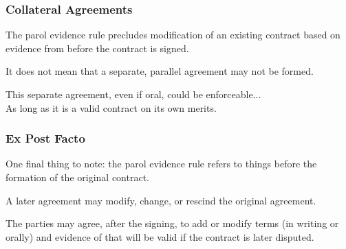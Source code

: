 \begin{frame}
\frametitle{Collateral Agreements}

The parol evidence rule precludes modification of an existing contract based on evidence from before the contract is signed.

It does not mean that a separate, parallel agreement may not be formed. 

This separate agreement, even if oral, could be enforceable...\\
\quad As long as it is a valid contract on its own merits.

\end{frame}


\begin{frame}
\frametitle{Ex Post Facto}

One final thing to note: the parol evidence rule refers to things before the formation of the original contract.

A later agreement may modify, change, or rescind the original agreement.

The parties may agree, after the signing, to add or modify terms (in writing or orally) and evidence of that will be valid if the contract is later disputed.


\end{frame}





